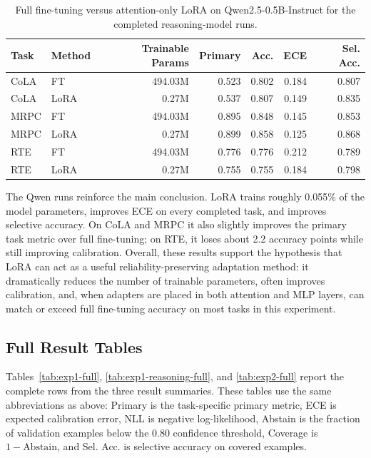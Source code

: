\begin{table}[t]
\centering
\small
\begin{tabular}{llrrrrr}
\toprule
Task & Method & Trainable Params & Primary & Acc. & ECE & Sel. Acc. \\
\midrule
CoLA & FT & 494.03M & 0.523 & 0.802 & 0.184 & 0.807 \\
CoLA & LoRA & 0.27M & 0.537 & 0.807 & 0.149 & 0.835 \\
MRPC & FT & 494.03M & 0.895 & 0.848 & 0.145 & 0.853 \\
MRPC & LoRA & 0.27M & 0.899 & 0.858 & 0.125 & 0.868 \\
RTE & FT & 494.03M & 0.776 & 0.776 & 0.212 & 0.789 \\
RTE & LoRA & 0.27M & 0.755 & 0.755 & 0.184 & 0.798 \\
\bottomrule
\end{tabular}
\caption{Full fine-tuning versus attention-only LoRA on Qwen2.5-0.5B-Instruct for the completed reasoning-model runs.}
\label{tab:qwen-ft-vs-lora-reliability}
\end{table}

The Qwen runs reinforce the main conclusion. LoRA trains roughly 0.055\% of the model parameters, improves ECE on every completed task, and improves selective accuracy. On CoLA and MRPC it also slightly improves the primary task metric over full fine-tuning; on RTE, it loses about 2.2 accuracy points while still improving calibration. Overall, these results support the hypothesis that LoRA can act as a useful reliability-preserving adaptation method: it dramatically reduces the number of trainable parameters, often improves calibration, and, when adapters are placed in both attention and MLP layers, can match or exceed full fine-tuning accuracy on most tasks in this experiment.

\subsection{Full Result Tables}
\label{sec:cola-full-results}

Tables~\ref{tab:exp1-full}, \ref{tab:exp1-reasoning-full}, and \ref{tab:exp2-full} report the complete rows from the three result summaries. These tables use the same abbreviations as above: Primary is the task-specific primary metric, ECE is expected calibration error, NLL is negative log-likelihood, Abstain is the fraction of validation examples below the 0.80 confidence threshold, Coverage is $1-\text{Abstain}$, and Sel. Acc. is selective accuracy on covered examples.

